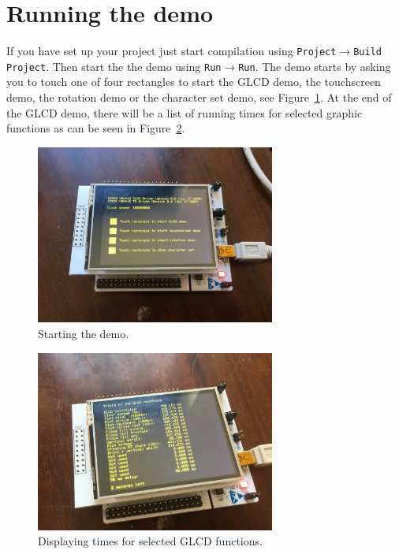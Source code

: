 \documentclass[12pt]{article}
\begin{document}
\section{Running the demo}
If you have set up your project just start compilation using \texttt{Project}$\rightarrow$\texttt{Build Project}. Then start the the demo using \texttt{Run}$\rightarrow$\texttt{Run}. The demo starts by asking you to touch one of four rectangles to start the GLCD demo, the touchscreen demo, the rotation demo or the character set demo, see Figure~\ref{fig:2}. At the end of the GLCD demo, there will be a list of running times for selected graphic functions as can be seen in Figure~\ref{fig:3}.

\begin{figure}[!ht]
\centering
\includegraphics[width=0.7\textwidth]{start_demo}
\caption{Starting the demo.}
\label{fig:2}
\end{figure}

\begin{figure}[!ht]
\centering
\includegraphics[width=0.7\textwidth]{times}
\caption{Displaying times for selected GLCD functions.}
\label{fig:3}
\end{figure}
\end{document}
